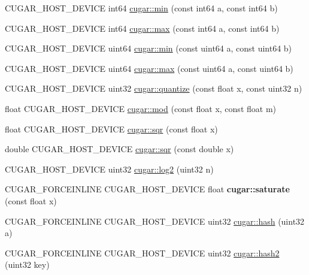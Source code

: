\begin{DoxyCompactItemize}
\item 
C\+U\+G\+A\+R\+\_\+\+H\+O\+S\+T\+\_\+\+D\+E\+V\+I\+CE int64 \hyperlink{group___basic_ga3914d3facba77353216fbd68e3df1dac}{cugar\+::min} (const int64 a, const int64 b)
\item 
C\+U\+G\+A\+R\+\_\+\+H\+O\+S\+T\+\_\+\+D\+E\+V\+I\+CE int64 \hyperlink{group___basic_ga73436f2862d38a231bd77222838d5aed}{cugar\+::max} (const int64 a, const int64 b)
\item 
C\+U\+G\+A\+R\+\_\+\+H\+O\+S\+T\+\_\+\+D\+E\+V\+I\+CE uint64 \hyperlink{group___basic_ga91b60ae04cc513c797e708b451486a12}{cugar\+::min} (const uint64 a, const uint64 b)
\item 
C\+U\+G\+A\+R\+\_\+\+H\+O\+S\+T\+\_\+\+D\+E\+V\+I\+CE uint64 \hyperlink{group___basic_ga6e9a695197d693dac4c2561830268fdb}{cugar\+::max} (const uint64 a, const uint64 b)
\item 
C\+U\+G\+A\+R\+\_\+\+H\+O\+S\+T\+\_\+\+D\+E\+V\+I\+CE uint32 \hyperlink{group___basic_gaec0861071178aa411d87f2e6e808cfc6}{cugar\+::quantize} (const float x, const uint32 n)
\item 
float C\+U\+G\+A\+R\+\_\+\+H\+O\+S\+T\+\_\+\+D\+E\+V\+I\+CE \hyperlink{group___basic_gaa6ea8810d6e0f5f42d49be632566378c}{cugar\+::mod} (const float x, const float m)
\item 
float C\+U\+G\+A\+R\+\_\+\+H\+O\+S\+T\+\_\+\+D\+E\+V\+I\+CE \hyperlink{group___basic_gad7305249aeb2b830090e37dd335f0b6a}{cugar\+::sqr} (const float x)
\item 
double C\+U\+G\+A\+R\+\_\+\+H\+O\+S\+T\+\_\+\+D\+E\+V\+I\+CE \hyperlink{group___basic_gaa8137b4ffa803b854990ff46df30ef63}{cugar\+::sqr} (const double x)
\item 
C\+U\+G\+A\+R\+\_\+\+H\+O\+S\+T\+\_\+\+D\+E\+V\+I\+CE uint32 \hyperlink{group___basic_gacde218a6ddefd0151e099ff9dc2967f5}{cugar\+::log2} (uint32 n)
\item 
\mbox{\label{group___basic_gab5948e91b44e5ee613b1354140cd369f}} 
C\+U\+G\+A\+R\+\_\+\+F\+O\+R\+C\+E\+I\+N\+L\+I\+NE C\+U\+G\+A\+R\+\_\+\+H\+O\+S\+T\+\_\+\+D\+E\+V\+I\+CE float {\bfseries cugar\+::saturate} (const float x)
\item 
C\+U\+G\+A\+R\+\_\+\+F\+O\+R\+C\+E\+I\+N\+L\+I\+NE C\+U\+G\+A\+R\+\_\+\+H\+O\+S\+T\+\_\+\+D\+E\+V\+I\+CE uint32 \hyperlink{group___basic_ga4c88b92d7c3a2616868a11282da2be2f}{cugar\+::hash} (uint32 a)
\item 
C\+U\+G\+A\+R\+\_\+\+F\+O\+R\+C\+E\+I\+N\+L\+I\+NE C\+U\+G\+A\+R\+\_\+\+H\+O\+S\+T\+\_\+\+D\+E\+V\+I\+CE uint32 \hyperlink{group___basic_ga52957987430d0e47da74bf0f6dd7fe71}{cugar\+::hash2} (uint32 key)

\end{DoxyCompactItemize}
